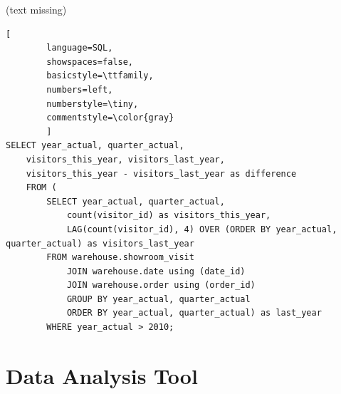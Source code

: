 \documentclass[letterpaper,12pt]{article}
\begin{document}
(text missing)

\begin{lstlisting}[
        language=SQL,
        showspaces=false,
        basicstyle=\ttfamily,
        numbers=left,
        numberstyle=\tiny,
        commentstyle=\color{gray}
        ]
SELECT year_actual, quarter_actual, 
	visitors_this_year, visitors_last_year,
	visitors_this_year - visitors_last_year as difference
	FROM (
		SELECT year_actual, quarter_actual,
			count(visitor_id) as visitors_this_year,
			LAG(count(visitor_id), 4) OVER (ORDER BY year_actual, quarter_actual) as visitors_last_year 
		FROM warehouse.showroom_visit
			JOIN warehouse.date using (date_id)
			JOIN warehouse.order using (order_id)
			GROUP BY year_actual, quarter_actual
			ORDER BY year_actual, quarter_actual) as last_year
		WHERE year_actual > 2010;
\end{lstlisting}

\section{Data Analysis Tool}


% 
\end{document}
